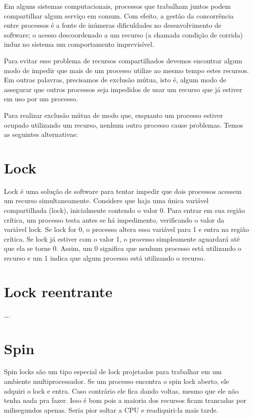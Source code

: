 
Em alguns sistemas computacionais, processos que trabalham juntos podem compartilhar algum 
serviço em comum. Com efeito, a gestão da concorrência entre processos é a fonte de inúmeras 
dificuldades no desenvolvimento de software; o acesso descoordenado a um recurso (a chamada 
condição de corrida) induz no sistema um comportamento imprevisível.

Para evitar esse problema de recursos compartilhados devemos encontrar algum modo de impedir 
que mais de um processo utilize ao mesmo tempo estes recursos. Em outras palavras, precisamos 
de exclusão mútua, isto é, algum modo de assegurar que outros processos seja impedidos de usar 
um recurso que já estiver em uso por um processo.

Para realizar exclusão mútua de modo que, enquanto um processo estiver ocupado utilizando um 
recurso, nenhum outro processo cause problemas. Temos as seguintes alternativas:

\section{Lock}

Lock é uma solução de software para tentar impedir que dois processos acessem um recurso 
simultaneamente. Considere que haja uma única variável compartilhada (lock), inicialmente 
contendo o valor 0. Para entrar em sua região crítica, um processo testa antes se há 
impedimento, verificando o valor da variável lock. Se lock for 0, o processo altera essa 
variável para 1 e entra na região crítica. Se lock já estiver com o valor 1, o processo 
simplesmente aguardará até que ela se torne 0. Assim, um 0 significa que nenhum processo 
está utilizando o recurso e um 1 indica que algum processo está utilizando o recurso. 


\section{Lock reentrante}
….

\section{Spin}

Spin locks são um tipo especial de lock projetados para trabalhar em um ambiente 
multiprocessador. Se um processo encontra o spin lock aberto, ele adquiri o lock e entra. 
Caso contrário ele fica dando voltas, mesmo que ele não tenha nada pra fazer. Isso é bom 
pois a maioria dos recursos ficam trancadas por milisegundos apenas. Seria pior soltar a 
CPU e readiquiri-la mais tarde.

